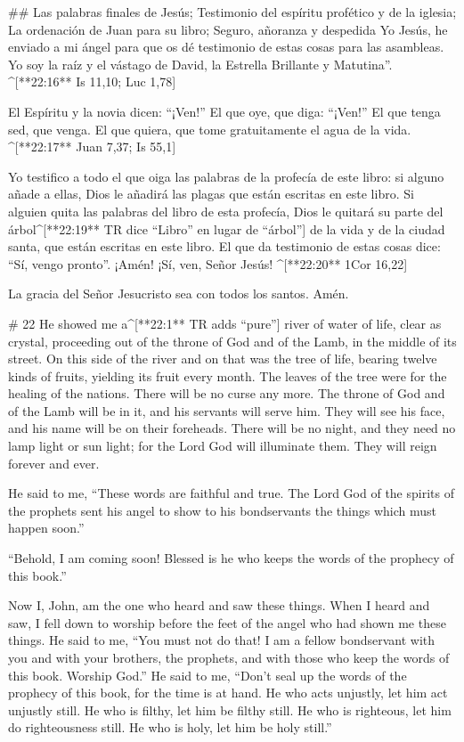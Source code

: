 \begin{paracols}{2}
## Las palabras finales de Jesús; Testimonio del espíritu profético y de la iglesia; La ordenación de Juan para su libro; Seguro, añoranza y despedida
 Yo Jesús, he enviado a mi ángel para que os dé testimonio de estas cosas para las asambleas. Yo soy la raíz y el vástago de David, la Estrella Brillante y Matutina”. ^[**22:16** Is 11,10; Luc 1,78]

 El Espíritu y la novia dicen: “¡Ven!” El que oye, que diga: “¡Ven!” El que tenga sed, que venga. El que quiera, que tome gratuitamente el agua de la vida. ^[**22:17** Juan 7,37; Is 55,1]

 Yo testifico a todo el que oiga las palabras de la profecía de este libro: si alguno añade a ellas, Dios le añadirá las plagas que están escritas en este libro.  Si alguien quita las palabras del libro de esta profecía, Dios le quitará su parte del árbol^[**22:19** TR dice “Libro” en lugar de “árbol”] de la vida y de la ciudad santa, que están escritas en este libro.  El que da testimonio de estas cosas dice: “Sí, vengo pronto”. ¡Amén! ¡Sí, ven, Señor Jesús! ^[**22:20** 1Cor 16,22]

 La gracia del Señor Jesucristo sea con todos los santos. Amén.
\switchcolumn
\begin{english}

# 22
 He showed me a^[**22:1** TR adds “pure”] river of water of life, clear as crystal, proceeding out of the throne of God and of the Lamb,  in the middle of its street. On this side of the river and on that was the tree of life, bearing twelve kinds of fruits, yielding its fruit every month. The leaves of the tree were for the healing of the nations.  There will be no curse any more. The throne of God and of the Lamb will be in it, and his servants will serve him.  They will see his face, and his name will be on their foreheads.  There will be no night, and they need no lamp light or sun light; for the Lord God will illuminate them. They will reign forever and ever. 

 He said to me, “These words are faithful and true. The Lord God of the spirits of the prophets sent his angel to show to his bondservants the things which must happen soon.” 

 “Behold, I am coming soon! Blessed is he who keeps the words of the prophecy of this book.” 

 Now I, John, am the one who heard and saw these things. When I heard and saw, I fell down to worship before the feet of the angel who had shown me these things.  He said to me, “You must not do that! I am a fellow bondservant with you and with your brothers, the prophets, and with those who keep the words of this book. Worship God.”  He said to me, “Don’t seal up the words of the prophecy of this book, for the time is at hand.  He who acts unjustly, let him act unjustly still. He who is filthy, let him be filthy still. He who is righteous, let him do righteousness still. He who is holy, let him be holy still.” 


\end{english}
\end{paracols}
